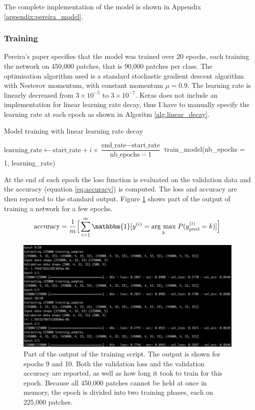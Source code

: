 \documentclass[12pt,a4paper,twoside,openright]{report}
\newcommand{\argmax}[1]{\underset{#1}{\operatorname{arg}\,\operatorname{max}}\;} %
\begin{document}
The complete implementation of the model is shown in Appendix \ref{appendix:pereira_model}. 

\subsubsection{Training}
Pereira's paper specifies that the model was trained over 20 epochs, each training the network on 450,000 patches, that is 90,000 patches per class. The optimisation algorithm used is a standard stochastic gradient descent algorithm with Nesterov momentum, with constant momentum $\mu = 0.9$. The learning rate is linearly decreased from $3 \times 10^{-5}$ to $3 \times 10^{-7}$. Keras does not include an implementation for linear learning rate decay, thus I have to manually specify the learning rate at each epoch as shown in Algoritm \ref{alg:linear_decay}.

\begin{algorithm}
\caption{Model training with linear learning rate decay}
\label{alg:linear_decay}
\begin{algorithmic}[1]
	\State $\text{learning\_rate} \gets \text{start\_rate} + i \times \dfrac{\text{end\_rate} - \text{start\_rate} }{ \text{nb\_epochs} - 1 }$
	\State train\_model(nb\_epochs = 1, learning\_rate)
\EndFor
\end{algorithmic}
\end{algorithm}

At the end of each epoch the loss function is evaluated on the validation data and the accuracy (equation \ref{eq:accuracy}) is computed. The loss and accuracy are then reported to the standard output. Figure \ref{fig:training_output} shows part of the output of training a network for a few epochs.
\begin{equation}
	\label{eq:accuracy}
		\text{accuracy} = 
	\frac{1}{m}\Big[\sum_{i=1}^m\mathbbm{1}[y^{(i)} = \argmax{k}P(y_{\text{pred}}^{(i)}=k)]\Big]
\end{equation}
\begin{figure}
	\centering
	\includegraphics[width=\textwidth]{training_output}
	\caption[Part of the output of the training script.]{Part of the output of the training script. The output is shown for epochs 9 and 10. Both the validation loss and the validation accuracy are reported, as well as how long it took to train for this epoch. Because all 450,000 patches cannot be held at once in memory, the epoch is divided into two training phases, each on 225,000 patches.}
	\label{fig:training_output}
\end{figure}
\end{document}
